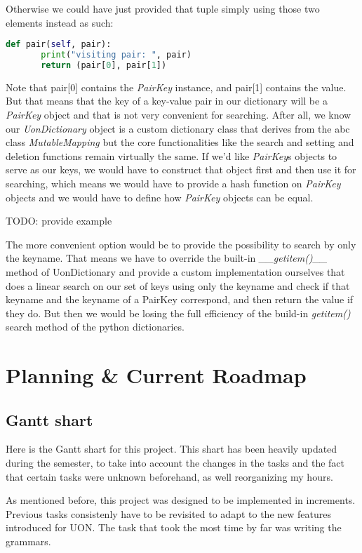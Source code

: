 \documentclass[12pt]{article}
\begin{document}
Otherwise we could have just provided that tuple simply using those two elements instead as such:
\begin{lstlisting}[language=Python]
def pair(self, pair):
       print("visiting pair: ", pair)
       return (pair[0], pair[1])
\end{lstlisting}

Note that pair[0] contains the \emph{PairKey} instance, and pair[1] contains the value. But that means that the key of a key-value pair in our dictionary will be a \emph{PairKey} object and that is not very convenient for searching. After all, we know our \emph{UonDictionary} object is a custom dictionary class that derives from the abc class \emph{MutableMapping} but the core functionalities like the search and setting and deletion functions remain virtually the same. If we’d like \emph{PairKey}s objects to serve as our keys, we would have to construct that object first and then use it for searching, which means we would have to provide a hash function on \emph{PairKey} objects and we would have to define how \emph{PairKey} objects can be equal. 

TODO: provide example

The more convenient option would be to provide the possibility to search by only the keyname. That means we have to override the built-in \emph{\_\_getitem()\_\_} method of UonDictionary and provide a custom implementation ourselves that does a linear search on our set of keys using only the keyname and check if that keyname and the keyname of a PairKey correspond, and then return the value if they do. But then we would be losing the full efficiency of the build-in \emph{getitem()} search method of the python dictionaries.

\pagebreak

\section{Planning \& Current Roadmap}

\subsection{Gantt shart}
Here is the Gantt shart for this project. This shart has been heavily updated during the semester, to take into account the changes in the tasks and the fact that certain tasks were unknown beforehand, as well reorganizing my hours. 

As mentioned before, this project was designed to be implemented in increments. Previous tasks consistenly have to be revisited to adapt to the new features introduced for UON. The task that took the most time by far was writing the grammars. 
\end{document}
